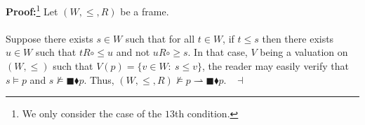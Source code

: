 \documentclass[draft]{article}
\newenvironment{proof}{{\bf Proof:}}{~$\dashv$\\}
\begin{document}
\begin{proof}\footnote{We only consider the case of the $13$th condition.}
%
%
Let $(W,{\leq},{R})$ be a frame.
%
%
\\
\\
%
%
%
%
%
%
%
Suppose there exists $s{\in}W$ such that for all $t{\in}W$, if $t{\leq}s$ then there exists $u{\in}W$ such that $t{R}{\circ}{\leq}u$ and not $u{R}{\circ}{\geq}s$.
In that case, $V$ being a valuation on $(W,{\leq})$ such that $V(p){=}\{v{\in}W:\ s{\leq}v\}$,
the reader may easily verify that $s{\models}p$ and $s{\not\models}{\blacksquare}{\blacklozenge}p$.
Thus, $(W,{\leq},{R}){\not\models}p{\rightharpoonup}{\blacksquare}{\blacklozenge}p$.
%
%
\medskip
%
%
\end{proof}
\end{document}
